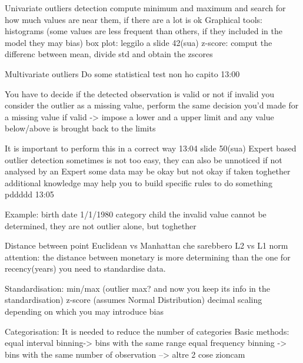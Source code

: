         Univariate outliers detection 
            compute minimum and maximum and search for how much values are near them, if there are a lot is ok 
            Graphical tools: histograms (some values are less frequent than others, if they included in the model they may bias)
                             box plot: leggilo a slide 42(sua)
                             z-score: comput the differenc between mean, divide std and obtain the zscores 
        
        Multivariate outliers 
            Do some statistical test non ho capito 13:00

        You have to decide if the detected observation is valid or not 
            if invalid you consider the outlier as a missing value, perform the same decision you'd made for a missing value 
            if valid -> impose a lower and a upper limit and any value below/above is brought back to the limits 
        
        It is important to perform this in a correct way 
            13:04 slide 50(sua)
        Expert based outlier detection 
            sometimes is not too easy, they can also be unnoticed if not analysed by an Expert  
                some data may be okay but not okay if taken toghether 
                additional knowledge may help you to build specific rules to do something pddddd 13:05

            Example:
                birth date 1/1/1980
                category child 
                the invalid value cannot be determined, they are not outlier alone, but toghether 

        Distance between point 
            Euclidean vs Manhattan che sarebbero L2 vs L1 norm 
                attention: the distance between monetary is more determining than the one for recency(years)
                    you need to standardise data.

        Standardisation:
            min/max (outlier max? and now you keep its info in the standardisation)
            z-score (assumes Normal Distribution)
            decimal scaling 
            depending on which you may introduce bias 
        
        Categorisation:
            It is needed to reduce the number of categories 
            Basic methods:
                equal interval binning-> bins with the same range
                equal frequency binning -> bins with the same number of observation
                --> altre 2 cose zioncam
        
